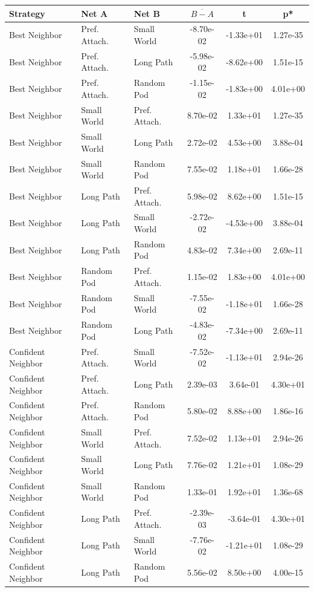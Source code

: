 \begin{table}[]
    \label{tab:t-instrat-fallback}
    \centering
    \begin{tabular}{l|ll|ccc}
        Strategy & Net A & Net B & $\overline{B - A}$ & t & p* \\
        \hline
Best Neighbor&Pref. Attach.&Small World&-8.70e-02&-1.33e+01&1.27e-35\\
Best Neighbor&Pref. Attach.&Long Path&-5.98e-02&-8.62e+00&1.51e-15\\
Best Neighbor&Pref. Attach.&Random Pod&-1.15e-02&-1.83e+00&4.01e+00\\
Best Neighbor&Small World&Pref. Attach.&8.70e-02&1.33e+01&1.27e-35\\
Best Neighbor&Small World&Long Path&2.72e-02&4.53e+00&3.88e-04\\
Best Neighbor&Small World&Random Pod&7.55e-02&1.18e+01&1.66e-28\\
Best Neighbor&Long Path&Pref. Attach.&5.98e-02&8.62e+00&1.51e-15\\
Best Neighbor&Long Path&Small World&-2.72e-02&-4.53e+00&3.88e-04\\
Best Neighbor&Long Path&Random Pod&4.83e-02&7.34e+00&2.69e-11\\
Best Neighbor&Random Pod&Pref. Attach.&1.15e-02&1.83e+00&4.01e+00\\
Best Neighbor&Random Pod&Small World&-7.55e-02&-1.18e+01&1.66e-28\\
Best Neighbor&Random Pod&Long Path&-4.83e-02&-7.34e+00&2.69e-11\\
\hline
Confident Neighbor&Pref. Attach.&Small World&-7.52e-02&-1.13e+01&2.94e-26\\
Confident Neighbor&Pref. Attach.&Long Path&2.39e-03&3.64e-01&4.30e+01\\
Confident Neighbor&Pref. Attach.&Random Pod&5.80e-02&8.88e+00&1.86e-16\\
Confident Neighbor&Small World&Pref. Attach.&7.52e-02&1.13e+01&2.94e-26\\
Confident Neighbor&Small World&Long Path&7.76e-02&1.21e+01&1.08e-29\\
Confident Neighbor&Small World&Random Pod&1.33e-01&1.92e+01&1.36e-68\\
Confident Neighbor&Long Path&Pref. Attach.&-2.39e-03&-3.64e-01&4.30e+01\\
Confident Neighbor&Long Path&Small World&-7.76e-02&-1.21e+01&1.08e-29\\
Confident Neighbor&Long Path&Random Pod&5.56e-02&8.50e+00&4.00e-15\\

\end{tabular}
\end{table}
